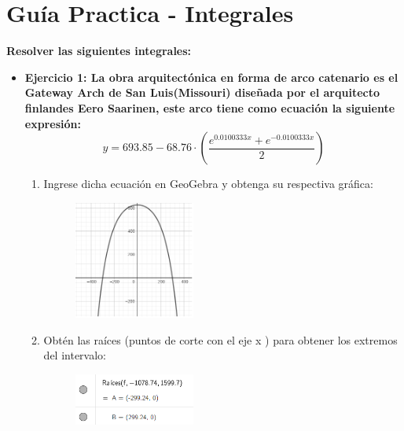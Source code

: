\documentclass[12pt]{article}
\begin{document}
    

    \section*{\centering Guía Practica - Integrales} \vspace{0.5cm}

    \textbf{Resolver las siguientes integrales: } \vspace{0.5cm}

    \begin{itemize}
        \item \textbf{Ejercicio 1: La obra arquitectónica en forma de arco catenario es el Gateway Arch de San Luis(Missouri) diseñada por el arquitecto finlandes Eero Saarinen, este arco tiene como ecuación la siguiente expresión:}
            \[y = 693.85 - 68.76 \cdot \left(\frac{e^{0.0100333x} + e^{-0.0100333x}}{2}\right)\]
        
            \begin{enumerate}
                \item Ingrese dicha ecuación en GeoGebra y obtenga su respectiva gráfica:
                    \begin{figure}[h!]
                        \centering
                        \includegraphics[width=0.4\textwidth]{img/t6-ej1-1.png}
                    \end{figure}
                
                \item Obtén las raíces (puntos de corte con el eje x ) para obtener los extremos del intervalo:
                    \begin{figure}[h!]
                        \centering
                        \includegraphics[width=0.4\textwidth]{img/t6-ej1-2.png}
                    \end{figure}


\end{enumerate}
\end{itemize}
\end{document}
